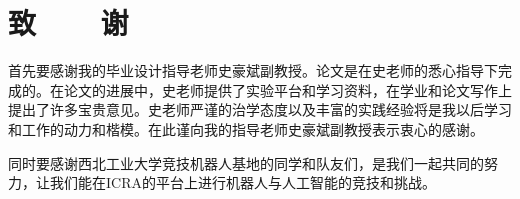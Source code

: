 ﻿%
%
%


%
%
\renewcommand{\baselinestretch}{1.5}
\fontsize{12pt}{13pt}\selectfont

\chapter*{致~~~~谢}
首先要感谢我的毕业设计指导老师史豪斌副教授。论文是在史老师的悉心指导下完成的。在论文的进展中，史老师提供了实验平台和学习资料，在学业和论文写作上提出了许多宝贵意见。史老师严谨的治学态度以及丰富的实践经验将是我以后学习和工作的动力和楷模。在此谨向我的指导老师史豪斌副教授表示衷心的感谢。

同时要感谢西北工业大学竞技机器人基地的同学和队友们，是我们一起共同的努力，让我们能在ICRA的平台上进行机器人与人工智能的竞技和挑战。


